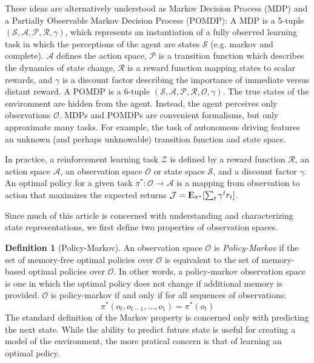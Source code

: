 \documentclass{article} %
\newcommand{\Expect}{{\rm I\kern-.3em E}}
\theoremstyle{definition}
\newtheorem{definition}{Definition}[section]
\begin{document}
These ideas are alternatively understood as Markov Decision Process
(MDP) and a Partially Observable Markov Decision Process (POMDP): A
MDP is a 5-tuple $(\mathcal{S}, \mathcal{A}, \mathcal{P}, \mathcal{R},
\gamma)$, which represents an instantiation of a fully observed
learning task in which the perceptions of the agent are states
$\mathcal{S}$ (e.g. markov and complete). $\mathcal{A}$ defines the
action space, $\mathcal{P}$ is a transition function which describes
the dynamics of state change, $\mathcal{R}$ is a reward function
mapping states to scalar rewards, and $\gamma$ is a discount factor
describing the importance of immediate versus distant reward. A POMDP
is a 6-tuple $(\mathcal{S}, \mathcal{A}, \mathcal{P}, \mathcal{R},
\mathcal{O}, \gamma)$. The true states of the environment are hidden
from the agent. Instead, the agent perceives only observations
$\mathcal{O}$. MDPs and POMDPs are convenient formalisms, but only
approximate many tasks. For example, the task of autonomous driving
features an unknown (and perhaps unknowable) transition function and
state space.

In practice, a reinforcement learning task $\mathcal{Z}$ is defined by
a reward function $\mathcal{R}$, an action space $\mathcal{A}$, an
observation space $\mathcal{O}$ or state space $\mathcal{S}$, and a
discount factor $\gamma$. An optimal policy for a given task $\pi^*:
\mathcal{O} \rightarrow \mathcal{A}$ is a mapping from observation to
action that maximizes the expected returns $\mathcal{J} =
\Expect_{\pi^*}[\sum_{t} \gamma^t r_t]$.

Since much of this article is concerned with understanding
and characterizing state representations, we first define two
properties of observation spaces.

\begin{definition}[Policy-Markov]
An observation space $\mathcal{O}$ is \textit{Policy-Markov} if the set
of memory-free optimal policies over $\mathcal{O}$ is equivalent to
the set of memory-based optimal policies over $\mathcal{O}$. In other
words, a policy-markov observation space is one in which the optimal
policy does not change if additional memory is provided. $\mathcal{O}$
is policy-markov if and only if for all sequences of observations:
\[
\pi^*(o_{t}, o_{t-1}, \dots, o_{1}) = \pi^*(o_{t})
\]
The standard definition of the Markov property is concerned only with
predicting the next state. While the ability to predict future state
is useful for creating a model of the environment, the more pratical
concern is that of learning an optimal policy.
\end{definition}
\end{document}
